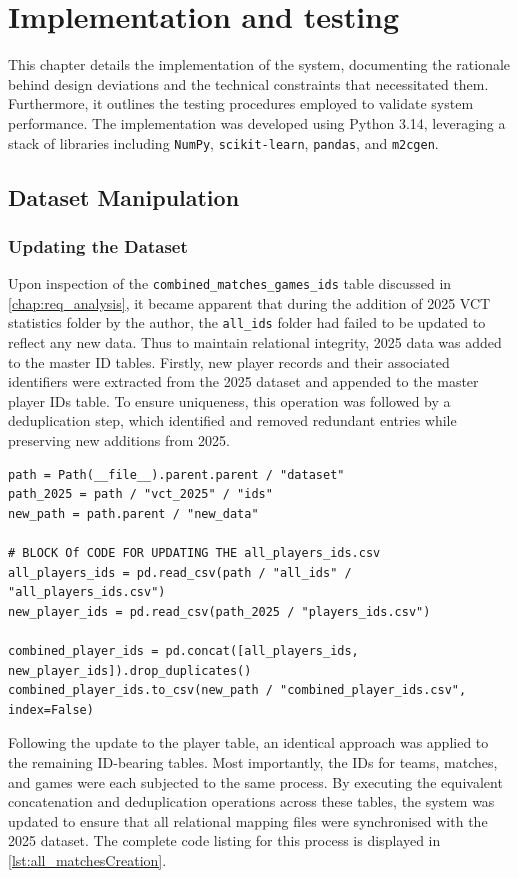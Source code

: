 \chapter{Implementation and testing}
This chapter details the implementation of the system, documenting the rationale behind design deviations and the technical constraints that necessitated them. Furthermore, it outlines the testing procedures employed to validate system performance. The implementation was developed using Python 3.14, leveraging a stack of libraries including \texttt{NumPy}, \texttt{scikit-learn}, \texttt{pandas}, and \texttt{m2cgen}.

\section{Dataset Manipulation}
\subsection{Updating the Dataset}
Upon inspection of the \texttt{combined_matches_games_ids} table discussed in \autoref{chap:req_analysis}, it became apparent that during the addition of 2025 VCT statistics folder by the author, the \texttt{all_ids} folder had failed to be updated to reflect any new data. Thus to maintain relational integrity, 2025 data was added to the master ID tables. Firstly, new player records and their associated identifiers were extracted from the 2025 dataset and appended to the master player IDs table. To ensure uniqueness, this operation was followed by a deduplication step, which identified and removed redundant entries while preserving new additions from 2025.
\begin{lstlisting}[style=code, caption={Introducing new 2025 VCT data into the master ID tables.}]
path = Path(__file__).parent.parent / "dataset"
path_2025 = path / "vct_2025" / "ids"
new_path = path.parent / "new_data"

# BLOCK Of CODE FOR UPDATING THE all_players_ids.csv
all_players_ids = pd.read_csv(path / "all_ids" / "all_players_ids.csv")
new_player_ids = pd.read_csv(path_2025 / "players_ids.csv")

combined_player_ids = pd.concat([all_players_ids, new_player_ids]).drop_duplicates()
combined_player_ids.to_csv(new_path / "combined_player_ids.csv", index=False)
\end{lstlisting}

Following the update to the player table, an identical approach was applied to the remaining ID-bearing tables. Most importantly, the IDs for teams, matches, and games were each subjected to the same process. By executing the equivalent concatenation and deduplication operations across these tables, the system was updated to ensure that all relational mapping files were synchronised with the 2025 dataset. The complete code listing for this process is displayed in \autoref{lst:all_matchesCreation}.

